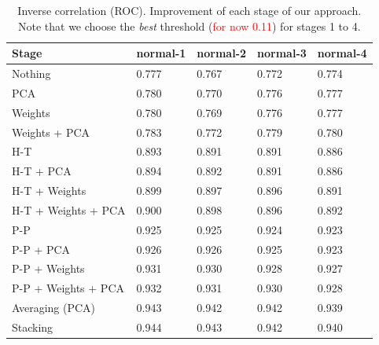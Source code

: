 \documentclass[wcp]{jmlr}
\begin{document}
\begin{table}[htb]
\centering
\caption{Inverse correlation (ROC). Improvement of each stage of our approach. Note that we choose the
         \textit{best} threshold (\textcolor{red}{for now 0.11}) for stages 1 to 4.}
\begin{tabular}{*{5}{l}}
\toprule
Stage               & normal-1 & normal-2 & normal-3 & normal-4 \\
\midrule
Nothing             & 0.777 & 0.767 & 0.772 & 0.774 \\
PCA                 & 0.780 & 0.770 & 0.776 & 0.777 \\
Weights             & 0.780 & 0.769 & 0.776 & 0.777 \\
Weights + PCA       & 0.783 & 0.772 & 0.779 & 0.780 \\
H-T                 & 0.893 & 0.891 & 0.891 & 0.886 \\
H-T + PCA           & 0.894 & 0.892 & 0.891 & 0.886 \\
H-T + Weights       & 0.899 & 0.897 & 0.896 & 0.891 \\
H-T + Weights + PCA & 0.900 & 0.898 & 0.896 & 0.892 \\
P-P                 & 0.925 & 0.925 & 0.924 & 0.923 \\
P-P + PCA           & 0.926 & 0.926 & 0.925 & 0.923 \\
P-P + Weights       & 0.931 & 0.930 & 0.928 & 0.927 \\
P-P + Weights + PCA & 0.932 & 0.931 & 0.930 & 0.928 \\
Averaging (PCA)     & 0.943 & 0.942 & 0.942 & 0.939 \\
Stacking            & 0.944 & 0.943 & 0.942 & 0.940 \\
\bottomrule
\end{tabular}
\end{table}
\end{document}

